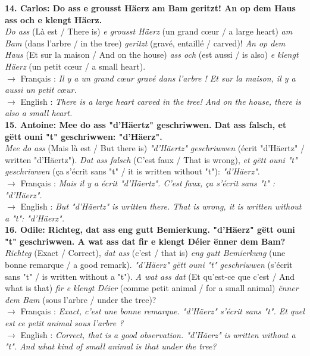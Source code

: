 \noindent\textbf{14. Carlos: Do ass e grousst Häerz am Bam geritzt! An op dem Haus ass och e klengt Häerz.}\\
\textit{Do ass} (Là est / There is) \textit{e grousst Häerz} (un grand cœur / a large heart) \textit{am Bam} (dans l'arbre / in the tree) \textit{geritzt} (gravé, entaillé / carved)! \textit{An op dem Haus} (Et sur la maison / And on the house) \textit{ass och} (est aussi / is also) \textit{e klengt Häerz} (un petit cœur / a small heart).\\
$\rightarrow$ Français : \textit{Il y a un grand cœur gravé dans l'arbre ! Et sur la maison, il y a aussi un petit cœur.}\\
$\rightarrow$ English : \textit{There is a large heart carved in the tree! And on the house, there is also a small heart.}\\[0.5em]

\noindent\textbf{15. Antoine: Mee do ass "d'Häertz" geschriwwen. Dat ass falsch, et gëtt ouni "t" geschriwwen: "d'Häerz".}\\
\textit{Mee do ass} (Mais là est / But there is) \textit{"d'Häertz" geschriwwen} (écrit "d'Häertz" / written "d'Häertz"). \textit{Dat ass falsch} (C'est faux / That is wrong), \textit{et gëtt ouni "t" geschriwwen} (ça s'écrit sans "t" / it is written without "t"): \textit{"d'Häerz"}.\\
$\rightarrow$ Français : \textit{Mais il y a écrit "d'Häertz". C'est faux, ça s'écrit sans "t" : "d'Häerz".}\\
$\rightarrow$ English : \textit{But "d'Häertz" is written there. That is wrong, it is written without a "t": "d'Häerz".}\\[0.5em]

\noindent\textbf{16. Odile: Richteg, dat ass eng gutt Bemierkung. "d'Häerz" gëtt ouni "t" geschriwwen. A wat ass dat fir e klengt Déier ënner dem Bam?}\\
\textit{Richteg} (Exact / Correct), \textit{dat ass} (c'est / that is) \textit{eng gutt Bemierkung} (une bonne remarque / a good remark). \textit{"d'Häerz" gëtt ouni "t" geschriwwen} (s'écrit sans "t" / is written without a "t"). \textit{A wat ass dat} (Et qu'est-ce que c'est / And what is that) \textit{fir e klengt Déier} (comme petit animal / for a small animal) \textit{ënner dem Bam} (sous l'arbre / under the tree)?\\
$\rightarrow$ Français : \textit{Exact, c'est une bonne remarque. "d'Häerz" s'écrit sans "t". Et quel est ce petit animal sous l'arbre ?}\\
$\rightarrow$ English : \textit{Correct, that is a good observation. "d'Häerz" is written without a "t". And what kind of small animal is that under the tree?}\\[0.5em]

